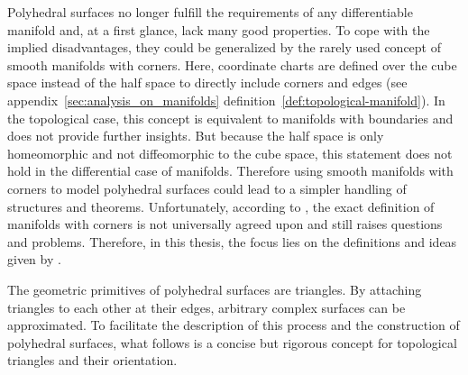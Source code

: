 \documentclass{stdlocal}
\begin{document}
  Polyhedral surfaces no longer fulfill the requirements of any differentiable manifold and, at a first glance, lack many good properties.
  To cope with the implied disadvantages, they could be generalized by the rarely used concept of smooth manifolds with corners.
  Here, coordinate charts are defined over the cube space instead of the half space to directly include corners and edges (see appendix~\ref{sec:analysis_on_manifolds} definition~\ref{def:topological-manifold}).
  In the topological case, this concept is equivalent to manifolds with boundaries and does not provide further insights.
  But because the half space is only homeomorphic and not diffeomorphic to the cube space, this statement does not hold in the differential case of manifolds.
  Therefore using smooth manifolds with corners to model polyhedral surfaces could lead to a simpler handling of structures and theorems.
  Unfortunately, according to \textcite{joyce2009}, the exact definition of manifolds with corners is not universally agreed upon and still raises questions and problems.
  Therefore, in this thesis, the focus lies on the definitions and ideas given by \textcite{polthier2006}.

  The geometric primitives of polyhedral surfaces are triangles.
  By attaching triangles to each other at their edges, arbitrary complex surfaces can be approximated.
  To facilitate the description of this process and the construction of polyhedral surfaces, what follows is a concise but rigorous concept for topological triangles and their orientation.
\end{document}
